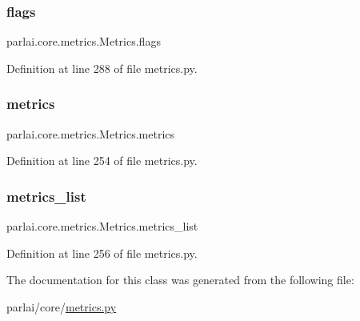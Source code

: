 \subsubsection{\texorpdfstring{flags}{flags}}
{\footnotesize\ttfamily parlai.\+core.\+metrics.\+Metrics.\+flags}



Definition at line 288 of file metrics.\+py.

\mbox{\label{classparlai_1_1core_1_1metrics_1_1Metrics_ad4d95ce9a2d1fdecf7fd9ef7cf282a15}} 
\subsubsection{\texorpdfstring{metrics}{metrics}}
{\footnotesize\ttfamily parlai.\+core.\+metrics.\+Metrics.\+metrics}



Definition at line 254 of file metrics.\+py.

\mbox{\label{classparlai_1_1core_1_1metrics_1_1Metrics_ae0d3620f86dd5cd08e4d1c097ac6dde4}} 
\subsubsection{\texorpdfstring{metrics\+\_\+list}{metrics\_list}}
{\footnotesize\ttfamily parlai.\+core.\+metrics.\+Metrics.\+metrics\+\_\+list}



Definition at line 256 of file metrics.\+py.



The documentation for this class was generated from the following file\+:\begin{DoxyCompactItemize}
\item 
parlai/core/\hyperlink{metrics_8py}{metrics.\+py}\end{DoxyCompactItemize}
